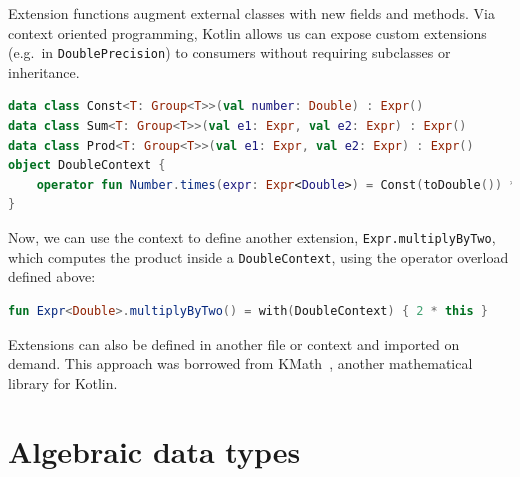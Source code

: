 \documentclass[12pt,initial,twoside,maitrise]{dms}
\def\inline{\lstinline[basicstyle=\ttfamily]}
\numberwithin{equation}{section}
\numberwithin{table}{chapter}
\numberwithin{figure}{chapter}
\begin{document}
Extension functions augment external classes with new fields and methods. Via context oriented programming, Kotlin allows us can expose custom extensions (e.g.\ in \inline{DoublePrecision}) to consumers without requiring subclasses or inheritance.
%
\begin{lstlisting}[caption={We can provide numerical extensions, wrapped in a context.}, language=Kotlin]
data class Const<T: Group<T>>(val number: Double) : Expr()
data class Sum<T: Group<T>>(val e1: Expr, val e2: Expr) : Expr()
data class Prod<T: Group<T>>(val e1: Expr, val e2: Expr) : Expr()
object DoubleContext {
    operator fun Number.times(expr: Expr<Double>) = Const(toDouble()) * expr
}
\end{lstlisting}
%
Now, we can use the context to define another extension, \inline{Expr.multiplyByTwo}, which computes the product inside a \inline{DoubleContext}, using the operator overload defined above:
%
\begin{lstlisting}[language=Kotlin]
fun Expr<Double>.multiplyByTwo() = with(DoubleContext) { 2 * this }
\end{lstlisting}
%
Extensions can also be defined in another file or context and imported on demand. This approach was borrowed from KMath~\cite{nozik2019acat}, another mathematical library for Kotlin.

\section{Algebraic data types}\label{sec:adts}
\end{document}
